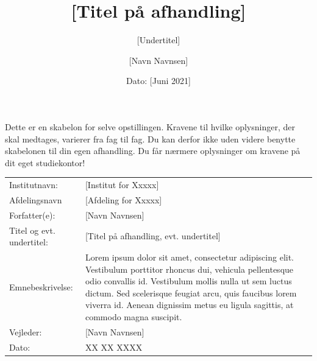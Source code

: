 \documentclass[12pt]{article}
\author{[Navn Navnsen]}
\title{[Titel på afhandling]}
\subtitle{[Undertitel]}
\date{Dato: {[Juni 2021]}}
\begin{document}
\maketitle

\onehalfspacing

\noindent Dette er en skabelon for selve opstillingen. Kravene til hvilke oplysninger, der skal medtages, varierer fra fag til fag. Du kan derfor ikke uden videre benytte skabelonen til din egen afhandling. Du får nærmere oplysninger om kravene på dit eget studiekontor!
\begin{table}[h]
\def\arraystretch{1.5}
\begin{tabularx}{\textwidth}{l X}
Institutnavn: & {[Institut for Xxxxx]}  \\
Afdelingsnavn & {[Afdeling for Xxxxx]} \\
Forfatter(e): & {[Navn Navnsen]} \\
Titel og evt. undertitel: & {[Titel på afhandling, evt. undertitel]} \\
Emnebeskrivelse: & Lorem ipsum dolor sit amet, consectetur adipiscing elit. Vestibulum porttitor rhoncus dui, vehicula pellentesque odio convallis id. Vestibulum mollis nulla ut sem luctus dictum. Sed scelerisque feugiat arcu, quis faucibus lorem viverra id. Aenean dignissim metus eu ligula sagittis, at commodo magna suscipit. \\
Vejleder: & {[Navn Navnsen]} \\
Dato: & XX XX XXXX
\end{tabularx}
\end{table}
\newpage

\tableofcontents
\newpage
\end{document}
